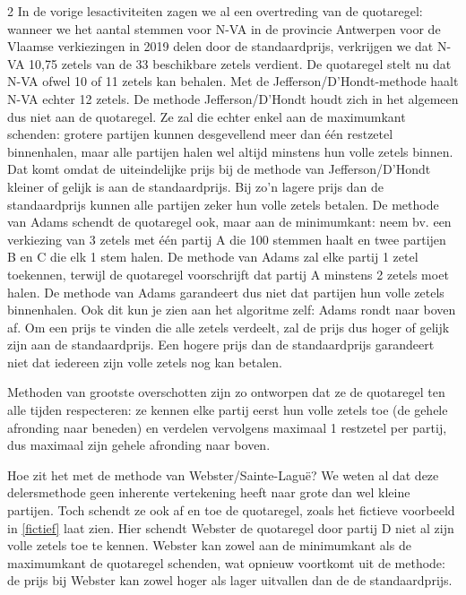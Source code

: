 \begin{multicols}{2}
In de vorige lesactiviteiten zagen we al een overtreding van de quotaregel: wanneer we het aantal stemmen voor N-VA in de provincie Antwerpen voor de Vlaamse verkiezingen in 2019 delen door de standaardprijs, verkrijgen we dat N-VA 10,75 zetels van de 33 beschikbare zetels verdient. De quotaregel stelt nu dat N-VA ofwel 10 of 11 zetels kan behalen. Met de Jefferson/D'Hondt-methode haalt N-VA echter 12 zetels. De methode Jefferson/D'Hondt houdt zich in het algemeen dus niet aan de quotaregel. Ze zal die echter enkel aan de maximumkant schenden: grotere partijen kunnen desgevellend meer dan één restzetel binnenhalen, maar alle partijen halen wel altijd minstens hun volle zetels binnen. Dat komt omdat de uiteindelijke prijs bij de methode van Jefferson/D'Hondt kleiner of gelijk is aan de standaardprijs. Bij zo'n lagere prijs dan de standaardprijs kunnen alle partijen zeker hun volle zetels betalen. De methode van Adams schendt de quotaregel ook, maar aan de minimumkant: neem bv. een verkiezing van 3 zetels met één partij A die 100 stemmen haalt en twee partijen B en C die elk 1 stem halen. De methode van Adams zal elke partij 1 zetel toekennen, terwijl de quotaregel voorschrijft dat partij A minstens 2 zetels moet halen. De methode van Adams garandeert dus niet dat partijen hun volle zetels binnenhalen. Ook dit kun je zien aan het algoritme zelf: Adams rondt naar boven af. Om een prijs te vinden die alle zetels verdeelt, zal de prijs dus hoger of gelijk zijn aan de standaardprijs. Een hogere prijs dan de standaardprijs garandeert niet dat iedereen zijn volle zetels nog kan betalen.

Methoden van grootste overschotten zijn zo ontworpen dat ze de quotaregel ten alle tijden respecteren: ze kennen elke partij eerst hun volle zetels toe (de gehele afronding naar beneden) en verdelen vervolgens maximaal 1 restzetel per partij, dus maximaal zijn gehele afronding naar boven.

Hoe zit het met de methode van Webster/Sainte-Laguë? We weten al dat deze delersmethode geen inherente vertekening heeft naar grote dan wel kleine partijen. Toch schendt ze ook af en toe de quotaregel, zoals het fictieve voorbeeld in \autoref{fictief} laat zien. Hier schendt Webster de quotaregel door partij D niet al zijn volle zetels toe te kennen. Webster kan zowel aan de minimumkant als de maximumkant de quotaregel schenden, wat opnieuw voortkomt uit de methode: de prijs bij Webster kan zowel hoger als lager uitvallen dan de de standaardprijs. 


\end{multicols}

